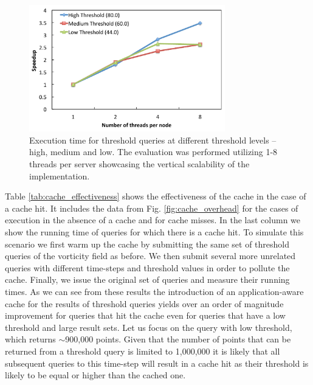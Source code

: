 \documentclass{sig-alternate}
\begin{document}
\begin{figure}
\centering
\includegraphics[width=3.35in]{Figures/scaleup.pdf}
\caption{Execution time for threshold queries at different threshold levels -- high, medium and low. The evaluation was performed utilizing 1-8
threads per server showcasing the vertical scalability of the implementation.}
\label{fig:scaleup}
\end{figure}

Table \ref{tab:cache_effectiveness} shows the effectiveness of the cache in the case of a cache hit. It includes the data from Fig. \ref{fig:cache_overhead}
for the cases of execution in the absence of a cache and for cache misses. In the last column we show the running time of queries for which there is a 
cache hit. To simulate this scenario we first warm up the cache by submitting the same set of threshold queries of the vorticity field as before. We then submit
several more unrelated queries with different time-steps and threshold values in order to pollute the cache. Finally, we issue the original set of queries and 
measure their running times. As we can see from these results the introduction of an application-aware cache for the results of threshold queries yields over
an order of magnitude improvement for queries that hit the cache even for queries that have a low threshold and large result sets. Let us focus on the query
with low threshold, which returns $\sim$900,000 points. Given that the number of points that can be returned from a threshold query is limited to 1,000,000
it is likely that all subsequent queries to this time-step will result in a cache hit as their threshold is likely to be equal or higher than the cached one.
\end{document}
